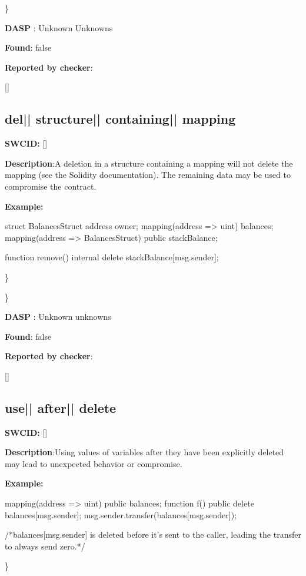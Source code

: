 \documentclass{article}
\begin{document}
\} 

\textbf{DASP} : Unknown Unknowns

\textbf{Found}: false

\textbf{Reported by checker}: 
\begin{ffcode} 

[]
\end{ffcode} 
\subsection{del{|\textunderscore| }structure{|\textunderscore| }containing{|\textunderscore| }mapping} 
\textbf{SWC{\textunderscore }ID:} []

\textbf{Description}:A deletion in a structure containing a mapping will not delete the mapping (see the Solidity documentation). The remaining data may be used to compromise the contract.


\textbf{Example:} 
\begin{ffcode} 

struct BalancesStruct{
    address owner;
    mapping(address => uint) balances;
}
mapping(address => BalancesStruct) public stackBalance;

function remove() internal{
      delete stackBalance[msg.sender];
}

\end{ffcode} 
\} 

\} 

\textbf{DASP} : Unknown unknowns

\textbf{Found}: false

\textbf{Reported by checker}: 
\begin{ffcode} 

[]
\end{ffcode} 
\subsection{use{|\textunderscore| }after{|\textunderscore| }delete} 
\textbf{SWC{\textunderscore }ID:} []

\textbf{Description}:Using values of variables after they have been explicitly deleted may lead to unexpected behavior or compromise.


\textbf{Example:} 
\begin{ffcode} 

mapping(address => uint) public balances;
function f() public {
    delete balances[msg.sender];
    msg.sender.transfer(balances[msg.sender]);
}

 /*balances[msg.sender] is deleted before it's sent to the caller, leading the transfer to always send zero.*/ 

\end{ffcode} 
\} 
\end{document}
